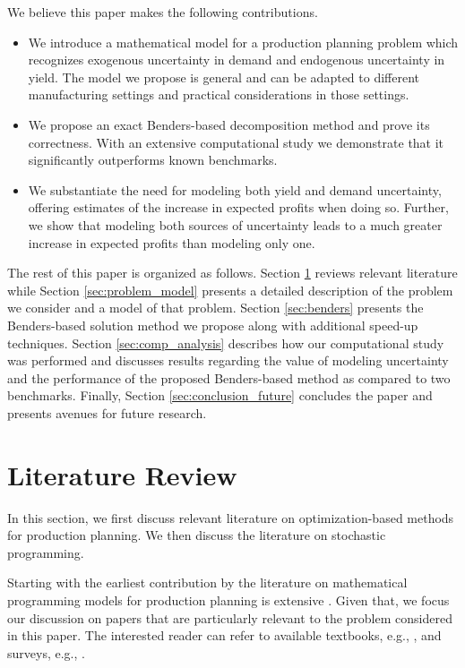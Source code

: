 \documentclass[12pt]{article}
\theoremstyle{thmstylethree}%
\begin{document}
We believe this paper makes the following contributions.
\begin{itemize}
    \item We introduce a mathematical model for a production planning problem which recognizes exogenous uncertainty in demand and endogenous uncertainty in yield. The model we propose is general and can be adapted to different manufacturing settings and practical considerations in those settings. 
    \item We propose an exact Benders-based decomposition method and prove its correctness. With an extensive computational study we demonstrate that it significantly outperforms known benchmarks. 
    \item We substantiate the need for modeling both yield and demand uncertainty, offering estimates of the increase in expected profits when doing so. Further, we show that modeling both sources of uncertainty leads to a much greater increase in expected profits than modeling only one.
\end{itemize}
The rest of this paper is organized as follows. Section \ref{sec:lit} reviews relevant literature while Section \ref{sec:problem_model} presents a detailed description of the problem we consider and a model of that problem. Section \ref{sec:benders} presents the Benders-based solution method we propose along with additional speed-up techniques. Section \ref{sec:comp_analysis} describes how our computational study was performed and discusses results regarding the value of modeling uncertainty and the performance of the proposed Benders-based method as compared to two benchmarks. Finally, Section \ref{sec:conclusion_future} concludes the paper and presents avenues for future research. 

\section{Literature Review}\label{sec:lit}

In this section, we first discuss relevant literature on optimization-based methods for production planning. We then discuss the literature on stochastic programming.

Starting with the earliest contribution by \cite{ModH55} the literature on mathematical programming models for production planning is extensive \cite{KemKU11}. Given that, we focus our discussion on papers that are particularly relevant to the problem considered in this paper. The interested reader can refer to available textbooks, e.g.,  \cite{JohM74,HaxC84,VosW06,KemKU11}, and surveys, e.g., \cite{GelV81,YanL95,GroG04,MulPGL06,DiaMP14,JamYFXJ19}.
\end{document}
